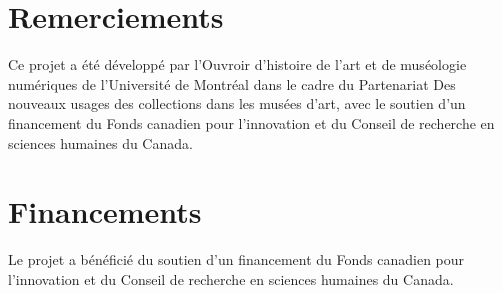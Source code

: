 \documentclass[fra, final]{anthology-ch}         %
\begin{document}
\section*{Remerciements}

Ce projet a été développé par l’Ouvroir d’histoire de l’art et de muséologie numériques de l’Université de Montréal dans le cadre du Partenariat Des nouveaux usages des collections dans les musées d’art, avec le soutien d’un financement du Fonds canadien pour l’innovation et du Conseil de recherche en sciences humaines du Canada. 

\section*{Financements}

Le projet a bénéficié du soutien d’un financement du Fonds canadien pour l’innovation et du Conseil de recherche en sciences humaines du Canada. 


\printbibliography

\appendix
\end{document}
